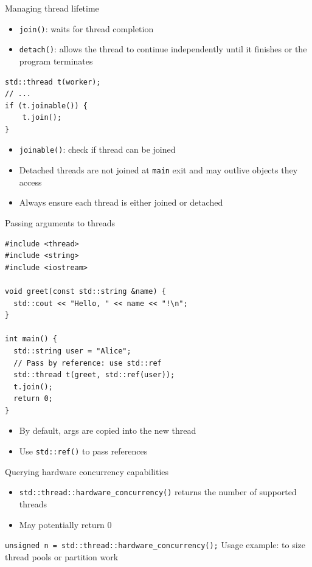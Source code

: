 \documentclass{beamer}
\begin{document}
\begin{frame}[fragile]{Managing thread lifetime}
  \begin{itemize}
    \item \texttt{join()}: waits for thread completion
    \item \texttt{detach()}: allows the thread to continue independently until it finishes or the program terminates
  \end{itemize}
  \lstset{style=CStyle}
  \begin{lstlisting}
std::thread t(worker);
// ...
if (t.joinable()) {
    t.join();
}
  \end{lstlisting}
  \begin{itemize}
    \item \texttt{joinable()}: check if thread can be joined
  \end{itemize}
  \begin{itemize}
    \item Detached threads are not joined at \texttt{main} exit and may outlive objects they access
    \item Always ensure each thread is either joined or detached
  \end{itemize}
\end{frame}

\begin{frame}[fragile]{Passing arguments to threads}
  \lstset{style=CStyle}
  \begin{lstlisting}
#include <thread>
#include <string>
#include <iostream>

void greet(const std::string &name) {
  std::cout << "Hello, " << name << "!\n";
}

int main() {
  std::string user = "Alice";
  // Pass by reference: use std::ref
  std::thread t(greet, std::ref(user));
  t.join();
  return 0;
}
  \end{lstlisting}
  \begin{itemize}
    \item By default, args are copied into the new thread
    \item Use \texttt{std::ref()} to pass references
  \end{itemize}
\end{frame}

\begin{frame}{Querying hardware concurrency capabilities}
  \begin{itemize}
    \item \texttt{std::thread::hardware\_concurrency()} returns the number of supported threads
    \item May potentially return 0
  \end{itemize}
  \texttt{unsigned n = std::thread::hardware\_concurrency();}
  Usage example: to size thread pools or partition work
\end{frame}
\end{document}

